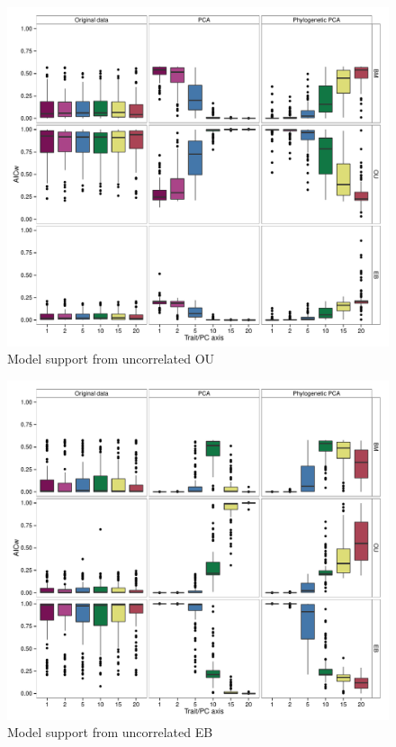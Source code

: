 \documentclass[a4paper,12pt]{article}
\begin{document}
\begin{figure}[p]
\centering
\includegraphics[scale=0.65]{./fig/box-aicw-mvou.pdf}
\caption{Model support from uncorrelated OU}
\label{aicwou}
\end{figure}

\begin{figure}[p]
\centering
\includegraphics[scale=0.65]{./fig/box-aicw-mveb.pdf}
\caption{Model support from uncorrelated EB}
\label{aicweb}
\end{figure}
\end{document}
